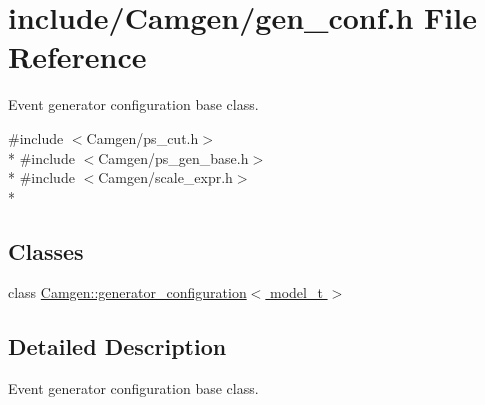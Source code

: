 \hypertarget{a00651}{}\section{include/\+Camgen/gen\+\_\+conf.h File Reference}
\label{a00651}


Event generator configuration base class.  


{\ttfamily \#include $<$Camgen/ps\+\_\+cut.\+h$>$}\\*
{\ttfamily \#include $<$Camgen/ps\+\_\+gen\+\_\+base.\+h$>$}\\*
{\ttfamily \#include $<$Camgen/scale\+\_\+expr.\+h$>$}\\*
\subsection*{Classes}
\begin{DoxyCompactItemize}
\item 
class \hyperlink{a00241}{Camgen\+::generator\+\_\+configuration$<$ model\+\_\+t $>$}
\end{DoxyCompactItemize}


\subsection{Detailed Description}
Event generator configuration base class. 

